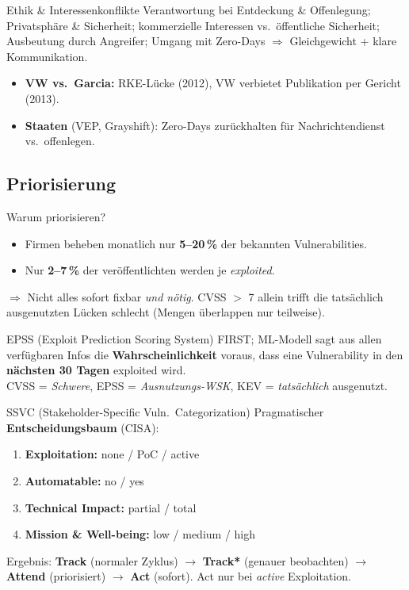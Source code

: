 \documentclass[a4paper, fontsize=7pt]{scrartcl}
\begin{document}
\begin{subbox}{Ethik \& Interessenkonflikte}
Verantwortung bei Entdeckung \& Offenlegung; Privatsphäre \& Sicherheit;
kommerzielle Interessen vs.\ öffentliche Sicherheit; Ausbeutung durch
Angreifer; Umgang mit Zero-Days $\Rightarrow$ Gleichgewicht + klare
Kommunikation.
\begin{itemize}
    \item \textbf{VW vs.\ Garcia:} RKE-Lücke (2012), VW verbietet
          Publikation per Gericht (2013).
    \item \textbf{Staaten} (VEP, Grayshift): Zero-Days zurückhalten für
          Nachrichtendienst vs.\ offenlegen.
\end{itemize}
\end{subbox}

\subsection{Priorisierung}

\begin{mainbox}{Warum priorisieren?}
\begin{itemize}
    \item Firmen beheben monatlich nur \textbf{5--20\,\%} der bekannten
          Vulnerabilities.
    \item Nur \textbf{2--7\,\%} der veröffentlichten werden je
          \emph{exploited}.
\end{itemize}
$\Rightarrow$ Nicht alles sofort fixbar \emph{und nötig}. CVSS $>$ 7
allein trifft die tatsächlich ausgenutzten Lücken schlecht (Mengen
überlappen nur teilweise).
\end{mainbox}

\begin{mainbox}{EPSS (Exploit Prediction Scoring System)}
FIRST; ML-Modell sagt aus allen verfügbaren Infos die
\textbf{Wahrscheinlichkeit} voraus, dass eine Vulnerability in den
\textbf{nächsten 30 Tagen} exploited wird.\\
CVSS = \emph{Schwere}, EPSS = \emph{Ausnutzungs-WSK}, KEV =
\emph{tatsächlich} ausgenutzt.
\end{mainbox}

\begin{mainbox}{SSVC (Stakeholder-Specific Vuln.\ Categorization)}
Pragmatischer \textbf{Entscheidungsbaum} (CISA):
\begin{enumerate}
    \item \textbf{Exploitation:} none / PoC / active
    \item \textbf{Automatable:} no / yes
    \item \textbf{Technical Impact:} partial / total
    \item \textbf{Mission \& Well-being:} low / medium / high
\end{enumerate}
Ergebnis: \textbf{Track} (normaler Zyklus) $\to$ \textbf{Track*}
(genauer beobachten) $\to$ \textbf{Attend} (priorisiert) $\to$
\textbf{Act} (sofort). Act nur bei \emph{active} Exploitation.
\end{mainbox}
\end{document}
